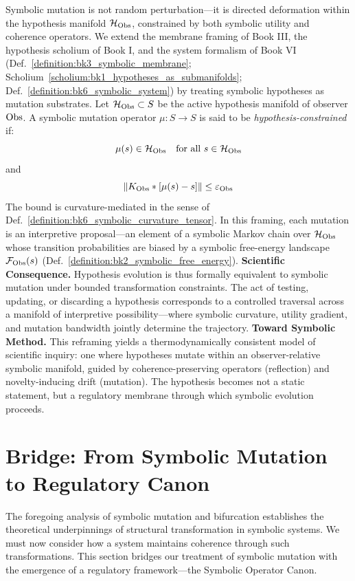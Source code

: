 \begin{scholium}
\label{scholium:bk6_hypotheses_as_regulatory_mutation_manifolds}
Symbolic mutation is not random perturbation—it is directed deformation within the hypothesis manifold $\mathcal{H}_{\mathrm{Obs}}$, constrained by both symbolic utility and coherence operators. We extend the membrane framing of Book III, the hypothesis scholium of Book I, and the system formalism of Book VI (Def.~\ref{definition:bk3_symbolic_membrane}; Scholium~\ref{scholium:bk1_hypotheses_as_submanifolds}; Def.~\ref{definition:bk6_symbolic_system}) by treating symbolic hypotheses as mutation substrates.
Let $\mathcal{H}_{\mathrm{Obs}} \subset S$ be the active hypothesis manifold of observer $\mathrm{Obs}$. A symbolic mutation operator $\mu : S \to S$ is said to be \emph{hypothesis-constrained} if:
\begin{equation}
\mu(s) \in \mathcal{H}_{\mathrm{Obs}} \quad \text{for all } s \in \mathcal{H}_{\mathrm{Obs}}
\end{equation}
and
\begin{equation}
\|K_{\mathrm{Obs}} \ast [\mu(s) - s]\| \leq \varepsilon_{\mathrm{Obs}}
\end{equation}
The bound is curvature-mediated in the sense of Def.~\ref{definition:bk6_symbolic_curvature_tensor}.
In this framing, each mutation is an interpretive proposal—an element of a symbolic Markov chain over $\mathcal{H}_{\mathrm{Obs}}$ whose transition probabilities are biased by a symbolic free-energy landscape $\mathcal{F}_{\mathrm{Obs}}(s)$ (Def.~\ref{definition:bk2_symbolic_free_energy}).
\textbf{Scientific Consequence.} Hypothesis evolution is thus formally equivalent to symbolic mutation under bounded transformation constraints. The act of testing, updating, or discarding a hypothesis corresponds to a controlled traversal across a manifold of interpretive possibility—where symbolic curvature, utility gradient, and mutation bandwidth jointly determine the trajectory.
\textbf{Toward Symbolic Method.} This reframing yields a thermodynamically consistent model of scientific inquiry: one where hypotheses mutate within an observer-relative symbolic manifold, guided by coherence-preserving operators (reflection) and novelty-inducing drift (mutation). The hypothesis becomes not a static statement, but a regulatory membrane through which symbolic evolution proceeds.
\end{scholium}
\section{Bridge: From Symbolic Mutation to Regulatory Canon}
\label{sec:bk6_bridge_from_symbolic_mutation_to_regulatory_canon}
The foregoing analysis of symbolic mutation and bifurcation establishes the theoretical underpinnings of structural transformation in symbolic systems. We must now consider how a system maintains coherence through such transformations. This section bridges our treatment of symbolic mutation with the emergence of a regulatory framework—the Symbolic Operator Canon.

